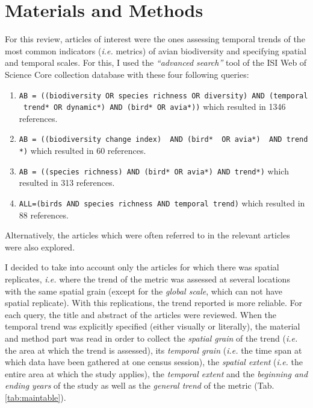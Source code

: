\documentclass[
  12pt,
  oneside]{report}
\begin{document}
\hypertarget{materials-and-methods}{%
\chapter{Materials and Methods}\label{materials-and-methods}}

For this review, articles of interest were the ones assessing temporal trends of the most common indicators (\emph{i.e.} metrics) of avian biodiversity and specifying spatial and temporal scales. For this, I used the \emph{``advanced search''} tool of the ISI Web of Science Core collection database with these four following queries:

\begin{enumerate}
\def\labelenumi{\arabic{enumi}.}
\item
  \texttt{AB\ =\ ((biodiversity\ OR\ species\ richness\ OR\ diversity)\ AND\ (temporal\ trend*\ OR\ dynamic*)\ AND\ (bird*\ OR\ avia*))} which resulted in 1346 references.
\item
  \texttt{AB\ =\ ((biodiversity\ change\ index)\ \ AND\ (bird*\ \ OR\ avia*)\ \ AND\ trend*)} which resulted in 60 references.
\item
  \texttt{AB\ =\ ((species\ richness)\ AND\ (bird*\ OR\ avia*)\ AND\ trend*)} which resulted in 313 references.
\item
  \texttt{ALL=(birds\ AND\ species\ richness\ AND\ temporal\ trend)} which resulted in 88 references.
\end{enumerate}

Alternatively, the articles which were often referred to in the relevant articles were also explored.

I decided to take into account only the articles for which there was spatial replicates, \emph{i.e.} where the trend of the metric was assessed at several locations with the same spatial grain (except for the \emph{global scale}, which can not have spatial replicate). With this replications, the trend reported is more reliable. For each query, the title and abstract of the articles were reviewed. When the temporal trend was explicitly specified (either visually or literally), the material and method part was read in order to collect the \emph{spatial grain} of the trend (\emph{i.e.} the area at which the trend is assessed), its \emph{temporal grain} (\emph{i.e.} the time span at which data have been gathered at one census session), the \emph{spatial extent} (\emph{i.e.} the entire area at which the study applies), the \emph{temporal extent} and the \emph{beginning and ending years} of the study as well as the \emph{general trend} of the metric (Tab. \ref{tab:maintable}).
\end{document}
